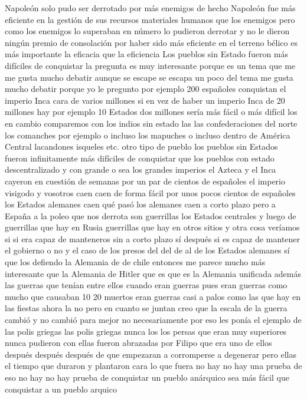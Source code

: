 Napoleón solo pudo ser derrotado por más enemigos de hecho Napoleón fue más eficiente en la gestión de sus recursos
materiales humanos que los enemigos pero como los enemigos lo superaban en número lo pudieron derrotar y no le dieron ningún premio de consolación
por haber sido más eficiente en el terreno bélico es más importante la eficacia que la eficiencia
Los pueblos sin Estado fueron más difíciles de conquistar
la pregunta es muy interesante porque es un tema que me me gusta mucho debatir aunque se escape se escapa un poco del tema
me gusta mucho debatir porque yo le pregunto por ejemplo 200 españoles conquistan el imperio Inca cara de varios millones
si en vez de haber un imperio Inca de 20 millones hay por ejemplo 10 Estados dos millones sería más fácil o más difícil
los en cambio comparemos con los indios sin estado las las confederaciones del norte los comanches por ejemplo
o incluso los mapuches o incluso dentro de América Central lacandones isqueles etc. otro tipo de pueblo
los pueblos sin Estados fueron infinitamente más difíciles de conquistar que los pueblos con estado descentralizado y con grande
o sea los grandes imperios el Azteca y el Inca cayeron en cuestión de semanas por un par de cientos de españoles el imperio visigodo y vosotros caen
caen de forma fácil por unos pocos cientos de españoles los Estados alemanes caen
qué pasó los alemanes caen a corto plazo
pero a España a la poleo que nos derrota son guerrillas los Estados centrales y luego de guerrillas que hay en Rusia
guerrillas que hay en otros sitios y otra cosa veríamos si si era capaz de manteneros sin a corto plazo sí después si es capaz de mantener el gobierno o no
y el caso de los presos del del de al de los Estados alemanes sí que los defiendo la Alemania de de chile entonces me parece mucho más interesante
que la Alemania de Hitler que es que es la Alemania unificada además las guerras que tenían entre ellos cuando eran guerras
pues eran guerras como mucho que causaban 10 20 muertos eran guerras casi a palos como las que hay en las fiestas ahora la no
pero en cuanto se juntan creo que la escala de la guerra cambió y no cambió para mejor
no necesariamente por eso les ponía el ejemplo de las polis griegas las polis griegas nunca los los persas que eran muy superiores
nunca pudieron con ellas fueron abrazadas por Filipo que era uno de ellos
después después después de que empezaran a corromperse a degenerar pero ellas el tiempo que duraron y plantaron cara
lo que fuera no hay no hay una prueba de eso no hay no hay prueba de conquistar un pueblo anárquico sea más fácil que conquistar a un pueblo arquico
